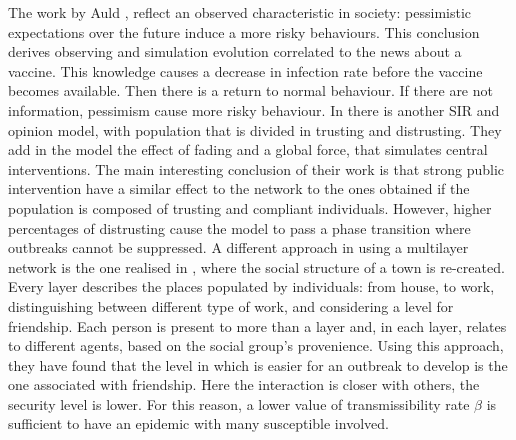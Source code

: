 The work by Auld \cite{Auld_2003}, reflect an observed characteristic in society: pessimistic expectations over the future induce a more risky behaviours. This conclusion derives observing and simulation evolution correlated to the news about a vaccine. This knowledge causes a decrease in infection rate before the vaccine becomes available. Then there is a return to normal behaviour. If there are not information, pessimism cause more risky behaviour. 
In \cite{Sontag_2022} there is another SIR and opinion model, with population that is divided in trusting and distrusting. They add in the model the effect of fading and a global force, that simulates central interventions. The main interesting conclusion of their work is that strong public intervention have a similar effect to the network to the ones obtained if the population is composed of trusting and compliant individuals. However, higher percentages of distrusting cause the model to pass a phase transition where outbreaks cannot be suppressed. 
A different approach in using a multilayer network is the one realised in \cite{Turker_2023}, where the social structure of a town is re-created. Every layer describes the places populated by individuals: from house, to work, distinguishing between different type of work, and considering a level for friendship. Each person is present to more than a layer and, in each layer, relates to different agents, based on the social group’s provenience.  Using this approach, they have found that the level in which is easier for an outbreak to develop is the one associated with friendship. Here the interaction is closer with others, the security level is lower. For this reason, a lower value of transmissibility rate $\beta$ is sufficient to have an epidemic with many susceptible involved. 

